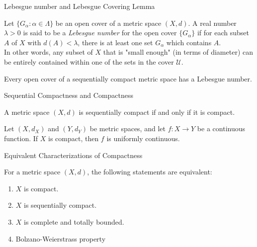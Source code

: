 \documentclass[12pt, a4paper]{article}
\begin{document}
\begin{heading}
    Lebesgue number and Lebesgue Covering Lemma
\end{heading}

\vspace{10pt}

\begin{definition}
    Let $\{G_\alpha : \alpha \in \Lambda\}$ be an open cover of a metric space $(X,d)$. A real number $\lambda > 0$ is said to be a \emph{Lebesgue number} for the open cover $\{G_\alpha\}$ if for each subset $A$ of $X$ with $d(A) < \lambda$, there is at least one set $G_\alpha$ which contains $A$. \\In other words, any subset of $X$ that is "small enough" (in terms of diameter) can be entirely contained within one of the sets in the cover $\mathcal{U}$.
\end{definition}

\clearpage

\begin{theorem}
    Every open cover of a sequentially compact metric space has a Lebesgue number.
\end{theorem}

\clearpage

\begin{heading}
    Sequential Compactness and Compactness
\end{heading}

\vspace{10pt}

\begin{theorem}
    A metric space $(X, d)$ is sequentially compact if and only if it is compact.
\end{theorem}

\clearpage

\begin{theorem}
    Let $(X, d_X)$ and $(Y, d_Y)$ be metric spaces, and let $f : X \to Y$ be a continuous function. If $X$ is compact, then $f$ is uniformly continuous.
\end{theorem}

\clearpage

\begin{heading}
    Equivalent Characterizations of Compactness
\end{heading}

\vspace{10pt}

\begin{theorem}
    For a metric space $(X, d)$, the following statements are equivalent:
    \begin{enumerate}
        \item $X$ is compact.
        \item $X$ is sequentially compact.
        \item $X$ is complete and totally bounded.
        \item Bolzano-Weierstrass property
    \end{enumerate}
\end{theorem}

\EndPage
\end{document}
